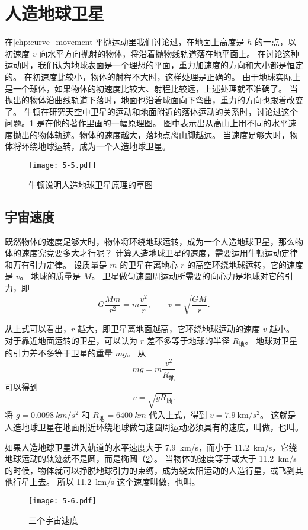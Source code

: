 \section{人造地球卫星}

在\cref{chp:curve_movement}平抛运动里我们讨论过，在地面上高度是 $h$ 的一点，以初速度 $v$ 向水平方向抛射的物体，将沿着抛物线轨道落在地平面上。
在讨论这种运动时，我们认为地球表面是一个理想的平面，重力加速度的方向和大小都是恒定的。
在初速度比较小，物体的射程不大时，这样处理是正确的。
由于地球实际上是一个球体，如果物体的初速度比较大、射程比较远，上述处理就不准确了。
当抛出的物体沿曲线轨道下落时，地面也沿着球面向下弯曲，重力的方向也跟着改变了。
牛顿在研究天空中卫星的运动和地面附近的落体运动的关系时，讨论过这个问题。\cref{fig:5-5} 是在他的著作里画的一幅原理图。
图中表示出从高山上用不同的水平速度抛出的物体轨迹。物体的速度越大，落地点离山脚越远。
当速度足够大时，物体将环绕地球运转，成为一个人造地球卫星。
\begin{figure}
	\texttt{[image: 5-5.pdf]}
	\caption{牛顿说明人造地球卫星原理的草图}\label{fig:5-5}
\end{figure}

\subsection{宇宙速度}

既然物体的速度足够大时，物体将环绕地球运转，成为一个人造地球卫星，那么物体的速度究竞要多大才行呢？
计算人造地球卫星的速度，需要运用牛顿运动定律和万有引力定律。
设质量是 $m$ 的卫星在离地心 $r$ 的高空环绕地球运转，它的速度是 $v$。
地球的质量是 $M$。
卫星做匀速圆周运动所需要的向心力是地球对它的引力，即
\[G\frac{Mm}{r^2}=m\frac{v^2}{r},\qquad v=\sqrt{\frac{GM}{r}}.\]

从上式可以看出，$r$ 越大，即卫星离地面越高，它环绕地球运动的速度 $v$ 越小。
对于靠近地面运转的卫星，可以认为 $r$ 差不多等于地球的半径 $R_{\text{地}}$。
地球对卫星的引力差不多等于卫星的重量 $mg$。
从
\[mg=m\frac{v^2}{R_{\text{地}}} \]
可以得到
\[v=\sqrt{gR_{\text{地}}}.\]
将 $g=\qty{0.0098}{km/s^2}$ 和 $R_{\text{地}}=\qty{6400}{km}$ 代入上式，得到 $v=\qty{7.9}{\km/s^2}$。
这就是人造地球卫星在地面附近环绕地球做匀速圆周运动必须具有的速度，叫做，也叫。

如果人造地球卫星进入轨道的水平速度大于 \qty{7.9}{km/s}，而小于 \qty{11.2}{km/s}，它绕地球运动的轨迹就不是圆，而是椭圆（\cref{fig:5-6}）。
当物体的速度等于或大于 \qty{11.2}{km/s} 的时候，物体就可以挣脱地球引力的束缚，成为绕太阳运动的人造行星，或飞到其他行星上去。
所以 \qty{11.2}{km/s} 这个速度叫做，也叫。
\begin{figure}
	\texttt{[image: 5-6.pdf]}
	\caption{三个宇宙速度}\label{fig:5-6}
\end{figure}

